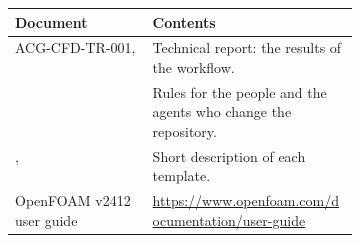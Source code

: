 \begin{tabularx}{\linewidth}{@{}P{0.40\linewidth} L@{}}
\toprule
Document & Contents \\
\midrule
ACG-CFD-TR-001,  & Technical report: the results of the workflow. \\
 & Rules for the people and the agents who change the repository. \\
,  & Short description of each template. \\
OpenFOAM v2412 user guide & \url{https://www.openfoam.com/documentation/user-guide} \\
\bottomrule
\end{tabularx}
